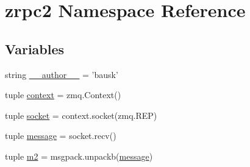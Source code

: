 \hypertarget{namespacezrpc2}{\section{zrpc2 Namespace Reference}
\label{namespacezrpc2}
}
\subsection*{Variables}
\begin{DoxyCompactItemize}
\item 
string \hyperlink{namespacezrpc2_ab6eb50c4b8d874520e4089b273b63e16}{\+\_\+\+\_\+author\+\_\+\+\_\+} = 'bausk'
\item 
tuple \hyperlink{namespacezrpc2_aad77b0202c8bdc01b68d63c381d5bb4b}{context} = zmq.\+Context()
\item 
tuple \hyperlink{namespacezrpc2_a5cc44b717d0374316398080bedecec05}{socket} = context.\+socket(zmq.\+R\+E\+P)
\item 
tuple \hyperlink{namespacezrpc2_a3a2870282951b1ba168443ba71d13079}{message} = socket.\+recv()
\item 
tuple \hyperlink{namespacezrpc2_a55892ab0cec9d46ce8b2a50f92998e57}{m2} = msgpack.\+unpackb(\hyperlink{namespacezrpc2_a3a2870282951b1ba168443ba71d13079}{message})
\end{DoxyCompactItemize}


